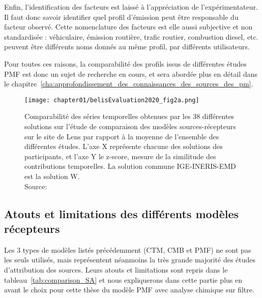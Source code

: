Enfin, l'identification des facteurs est laissé à l'appréciation de l'expérimentateur. Il
faut donc savoir identifier quel profil d'émission peut être responsable du facteur
observé. Cette nomenclature des facteurs est elle aussi subjective et non standardisée :
véhiculaire, émission routière, trafic routier, combustion diesel, etc. peuvent être
différents noms donnés au même profil, par différents utilisateurs.

Pour toutes ces raisons, la comparabilité des profils issus de différentes études PMF
est donc un sujet de recherche en cours, et sera abordée plus en détail dans le
chapitre~\ref{cha:approfondissement_des_connaissances_des_sources_des_pm}.

\begin{figure}[ht]
    \centering
    \texttt{[image: chapter01/belisEvaluation2020\_fig2a.png]}
    \caption{Comparabilité des séries temporelles obtenues par les 38 différentes solutions
    sur l'étude de comparaison des modèles sources-récepteurs sur le site de Lens par
    rapport à la moyenne de l'ensemble des différentes études. L'axe X représente chacune des
    solutions des participants, et l'axe Y le z-score, mesure de la similitude des
contributions temporelles. La solution commune IGE-INERIS-EMD est la solution W.\\
Source: \cite{belisEvaluation2020}}%
    \label{fig:chapter01/belisEvaluation2020_fig2a}
\end{figure}

\subsection{Atouts et limitations des différents modèles récepteurs}%
\label{ssub:atouts_et_limitations_des_différents_modèles_récepteurs}

Les 3 types de modèles listés précédemment (CTM, CMB et PMF) ne sont pas les seuls
utilisés, mais représentent néanmoins la très grande majorité des études d'attribution
des sources. Leurs atouts et limitations sont repris dans le
tableau~\ref{tab:comparison_SA} et nous expliquerons dans cette partie plus en avant le
choix pour cette thèse du modèle PMF avec analyse chimique sur filtre.

